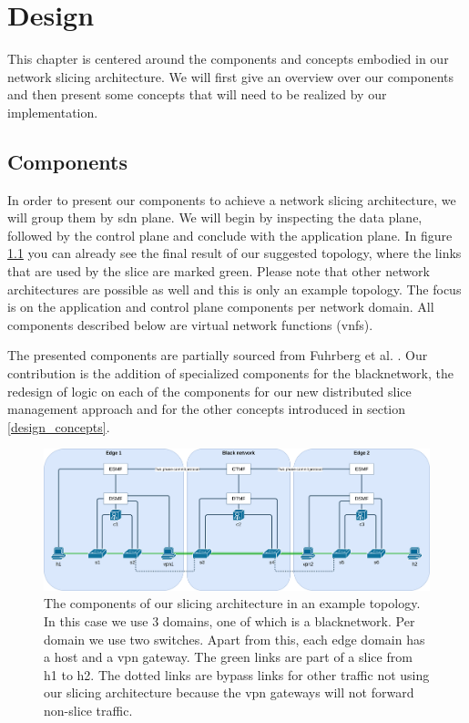 \chapter{Design}
\label{design}

This chapter is centered around the components and concepts embodied in our network slicing architecture. We will first give an overview over our components and then present some concepts that will need to be realized by our implementation.


\section{Components}
In order to present our components to achieve a network slicing architecture, we will group them by \acrshort{sdn} plane. We will begin by inspecting the data plane, followed by the control plane and conclude with the application plane. In figure \ref{fig:topology} you can already see the final result of our suggested topology, where the links that are used by the slice are marked green. Please note that other network architectures are possible as well and this is only an example topology. The focus is on the application and control plane components per network domain. All components described below are virtual network functions (\acrshort{vnf}s).

The presented components are partially sourced from Fuhrberg et al. \cite{SE4}. Our contribution is the addition of specialized components for the \gls{blacknetwork}, the redesign of logic on each of the components for our new distributed slice management approach and for the other concepts introduced in section \ref{design_concepts}.

    \begin{figure}[ht]
        \centering
        \includegraphics[width=\linewidth]{images/chapter_5/topology.png}
        \caption[Slicing architecture components]{The components of our slicing architecture in an example topology. In this case we use 3 domains, one of which is a \gls{blacknetwork}. Per domain we use two switches. Apart from this, each edge domain has a host and a \acrshort{vpn} gateway. The green links are part of a slice from h1 to h2. The dotted links are bypass links for other traffic not using our slicing architecture because the \acrshort{vpn} gateways will not forward non-slice traffic.}
        \label{fig:topology}
    \end{figure}

